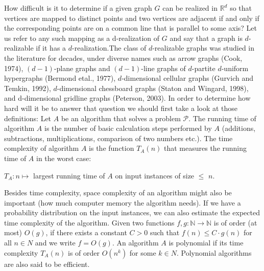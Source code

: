 \documentclass[12pt,a4paper,titlepage,openany]{report}
\begin{document}
How difficult is it to determine if
a given graph $G$ can be realized in $\mathbb{R}^d$ so that vertices are mapped to distinct points and two vertices are adjacent if and only if the corresponding points are on a common line that is parallel to some axis? Let us refer to any such mapping as a d-realization of $G$ and say that a graph is $d$-realizable if it has a $d$-realization.The class of $d$-realizable graphs was studied
in the literature for decades, under diverse names such as arrow graphs (Cook, 1974), $(d - 1)$-plane graphs and $(d -1)$-line graphs of $d$-partite $d$-uniform hypergraphs (Bermond etal., 1977), $d$-dimensional cellular graphs (Gurvich and Temkin, 1992), $d$-dimensional chessboard graphs (Staton and Wingard, 1998), and d-dimensional gridline graphs (Peterson, 2003).\newline
In order to determine how hard will it be to answer that question we should first take a look at those definitions:\newline
Let $A$ be an algorithm that solves a problem $\mathcal{P}$. The running time of algorithm $A$ is the number of basic calculation steps performed by $A$ (additions, subtractions, multiplications, comparison of two numbers etc.). The time complexity of algorithm $A$ is the function $T_A(n)$ that
measures the running time of $A$ in the worst case:
\begin{center}
	$T_A : n \mapsto $ largest running time of $A$ on input instances of size $\leq$ $n$.
\end{center} 
Besides time complexity, space complexity of an algorithm might also be important (how much computer memory the algorithm needs). If we have a probability distribution on the input instances, we can also estimate the expected time complexity of the algorithm.\newline
Given two functions $f,g : \mathbb{N} \to \mathbb{N}$ is of order (at most) $O(g)$, if there exists a constant $C > 0$ such that $f(n) \leq C\cdot g(n)$ for all $n \in N$ and we write $f = O(g)$.\newline
An algorithm $A$ is polynomial if its time complexity $T_A(n)$ is of order $O(n^k)$ for some $k \in N$.
Polynomial algorithms are also said to be efficient.
\end{document}
